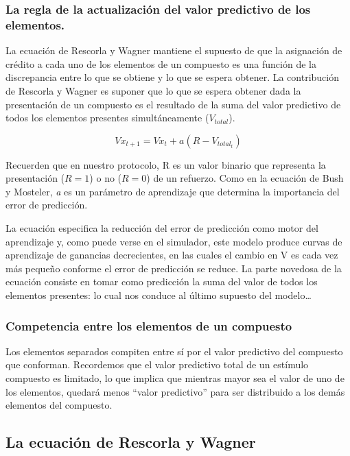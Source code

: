 \documentclass[
  letterpaper,
]{book}
\begin{document}
\subsubsection{La regla de la actualización del valor predictivo de los
elementos.}\label{la-regla-de-la-actualizaciuxf3n-del-valor-predictivo-de-los-elementos.}

La ecuación de Rescorla y Wagner mantiene el supuesto de que la
asignación de crédito a cada uno de los elementos de un compuesto es una
función de la discrepancia entre lo que se obtiene y lo que se espera
obtener. La contribución de Rescorla y Wagner es suponer que lo que se
espera obtener dada la presentación de un compuesto es el resultado de
la suma del valor predictivo de todos los elementos presentes
simultáneamente (\(V_{total}\)).

\[
Vx_{t+1} = Vx_t + a(R-V_{total_t})
\]

Recuerden que en nuestro protocolo, R es un valor binario que representa
la presentación (\(R=1\)) o no (\(R=0\)) de un refuerzo. Como en la
ecuación de Bush y Mosteler, \emph{a} es un parámetro de aprendizaje que
determina la importancia del error de predicción.

La ecuación especifica la reducción del error de predicción como motor
del aprendizaje y, como puede verse en el simulador, este modelo produce
curvas de aprendizaje de ganancias decrecientes, en las cuales el cambio
en V es cada vez más pequeño conforme el error de predicción se reduce.
La parte novedosa de la ecuación consiste en tomar como predicción la
suma del valor de todos los elementos presentes: lo cual nos conduce al
último supuesto del modelo\ldots{}

\subsubsection{Competencia entre los elementos de un
compuesto}\label{competencia-entre-los-elementos-de-un-compuesto}

Los elementos separados compiten entre sí por el valor predictivo del
compuesto que conforman. Recordemos que el valor predictivo total de un
estímulo compuesto es limitado, lo que implica que mientras mayor sea el
valor de uno de los elementos, quedará menos ``valor predictivo'' para
ser distribuido a los demás elementos del compuesto.

\subsection{La ecuación de Rescorla y
Wagner}\label{la-ecuaciuxf3n-de-rescorla-y-wagner}
\end{document}
